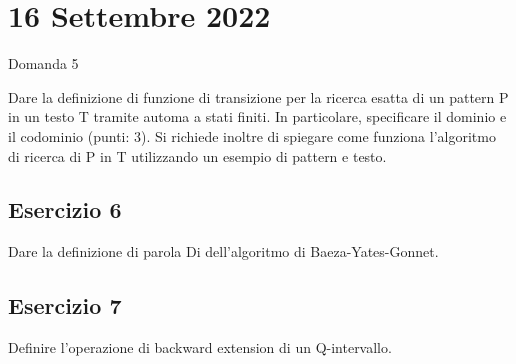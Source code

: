 \chapter{16 Settembre 2022}

Domanda 5

Dare la definizione di funzione di transizione per la ricerca esatta di un pattern P in un testo T tramite automa a stati finiti. In particolare, specificare il dominio e il codominio (punti: 3).
Si richiede inoltre di spiegare come funziona l'algoritmo di ricerca di P in T utilizzando un esempio di pattern e testo.

\section{Esercizio 6}

Dare la definizione di parola Di dell'algoritmo di Baeza-Yates-Gonnet.

\section{Esercizio 7}

Definire l'operazione di backward extension di un Q-intervallo.
